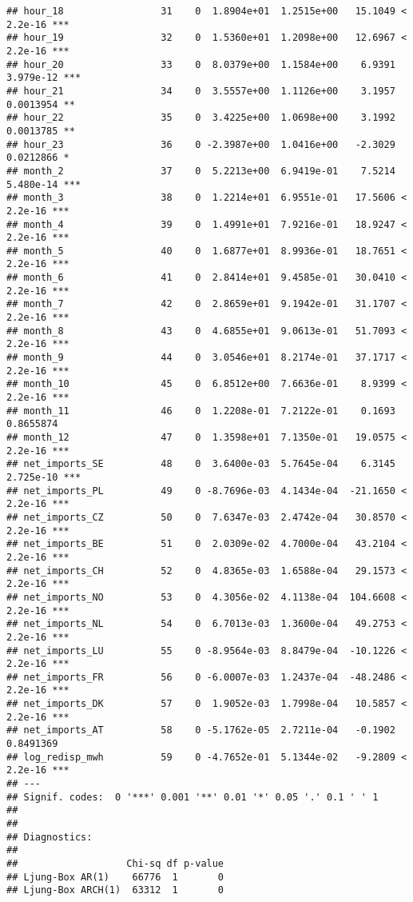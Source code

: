 \documentclass[
]{article}
\begin{document}
\begin{verbatim}
## hour_18                 31    0  1.8904e+01  1.2515e+00   15.1049 < 2.2e-16 ***
## hour_19                 32    0  1.5360e+01  1.2098e+00   12.6967 < 2.2e-16 ***
## hour_20                 33    0  8.0379e+00  1.1584e+00    6.9391 3.979e-12 ***
## hour_21                 34    0  3.5557e+00  1.1126e+00    3.1957 0.0013954 ** 
## hour_22                 35    0  3.4225e+00  1.0698e+00    3.1992 0.0013785 ** 
## hour_23                 36    0 -2.3987e+00  1.0416e+00   -2.3029 0.0212866 *  
## month_2                 37    0  5.2213e+00  6.9419e-01    7.5214 5.480e-14 ***
## month_3                 38    0  1.2214e+01  6.9551e-01   17.5606 < 2.2e-16 ***
## month_4                 39    0  1.4991e+01  7.9216e-01   18.9247 < 2.2e-16 ***
## month_5                 40    0  1.6877e+01  8.9936e-01   18.7651 < 2.2e-16 ***
## month_6                 41    0  2.8414e+01  9.4585e-01   30.0410 < 2.2e-16 ***
## month_7                 42    0  2.8659e+01  9.1942e-01   31.1707 < 2.2e-16 ***
## month_8                 43    0  4.6855e+01  9.0613e-01   51.7093 < 2.2e-16 ***
## month_9                 44    0  3.0546e+01  8.2174e-01   37.1717 < 2.2e-16 ***
## month_10                45    0  6.8512e+00  7.6636e-01    8.9399 < 2.2e-16 ***
## month_11                46    0  1.2208e-01  7.2122e-01    0.1693 0.8655874    
## month_12                47    0  1.3598e+01  7.1350e-01   19.0575 < 2.2e-16 ***
## net_imports_SE          48    0  3.6400e-03  5.7645e-04    6.3145 2.725e-10 ***
## net_imports_PL          49    0 -8.7696e-03  4.1434e-04  -21.1650 < 2.2e-16 ***
## net_imports_CZ          50    0  7.6347e-03  2.4742e-04   30.8570 < 2.2e-16 ***
## net_imports_BE          51    0  2.0309e-02  4.7000e-04   43.2104 < 2.2e-16 ***
## net_imports_CH          52    0  4.8365e-03  1.6588e-04   29.1573 < 2.2e-16 ***
## net_imports_NO          53    0  4.3056e-02  4.1138e-04  104.6608 < 2.2e-16 ***
## net_imports_NL          54    0  6.7013e-03  1.3600e-04   49.2753 < 2.2e-16 ***
## net_imports_LU          55    0 -8.9564e-03  8.8479e-04  -10.1226 < 2.2e-16 ***
## net_imports_FR          56    0 -6.0007e-03  1.2437e-04  -48.2486 < 2.2e-16 ***
## net_imports_DK          57    0  1.9052e-03  1.7998e-04   10.5857 < 2.2e-16 ***
## net_imports_AT          58    0 -5.1762e-05  2.7211e-04   -0.1902 0.8491369    
## log_redisp_mwh          59    0 -4.7652e-01  5.1344e-02   -9.2809 < 2.2e-16 ***
## ---
## Signif. codes:  0 '***' 0.001 '**' 0.01 '*' 0.05 '.' 0.1 ' ' 1
## 
## 
## Diagnostics:
## 
##                   Chi-sq df p-value
## Ljung-Box AR(1)    66776  1       0
## Ljung-Box ARCH(1)  63312  1       0
\end{verbatim}
\end{document}
